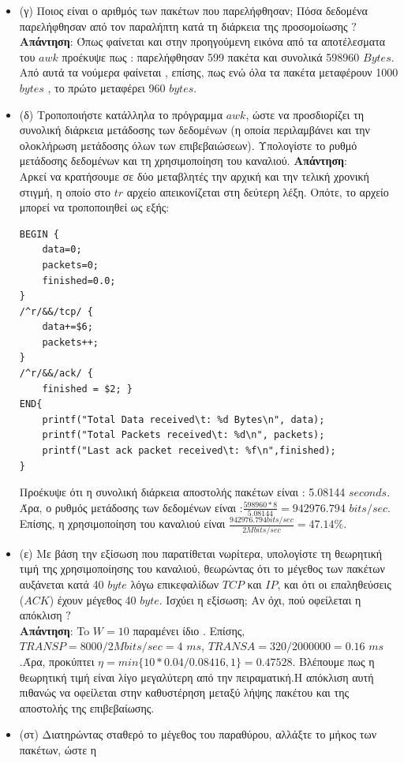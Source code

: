 \documentclass{article}%
\begin{document}
\begin{itemize}
\item	(γ) Ποιος είναι ο αριθμός των πακέτων που παρελήφθησαν; Πόσα δεδομένα παρελήφθησαν από τον
παραλήπτη κατά τη διάρκεια της προσομοίωσης $?$
\textbf{Απάντηση}:	Όπως φαίνεται και στην προηγούμενη εικόνα από τα αποτέλεσματα του $awk$ προέκυψε πως : παρελήφθησαν 599 πακέτα και συνολικά 598960 $Bytes$. Από αυτά τα νούμερα φαίνεται , επίσης, πως ενώ όλα τα πακέτα μεταφέρουν 1000 $bytes$ , το πρώτο μεταφέρει 960 $bytes$.
\\
\item	(δ) Τροποποιήστε κατάλληλα το πρόγραμμα $awk$, ώστε να προσδιορίζει τη συνολική διάρκεια
μετάδοσης των δεδομένων (η οποία περιλαμβάνει και την ολοκλήρωση μετάδοσης όλων των
επιβεβαιώσεων). Υπολογίστε το ρυθμό μετάδοσης δεδομένων και τη χρησιμοποίηση του καναλιού. 
\textbf{Απάντηση}:\\ Αρκεί να κρατήσουμε σε δύο μεταβλητές την αρχική και την τελική χρονική στιγμή, η οποίο στο $tr$ αρχείο απεικονίζεται στη δεύτερη λέξη. Οπότε, το αρχείο μπορεί να τροποποιηθεί ως εξής:
\begin{verbatim}
BEGIN {
	data=0;
	packets=0;
	finished=0.0;
}
/^r/&&/tcp/ {
	data+=$6;
	packets++;
}
/^r/&&/ack/ {
	finished = $2; }
END{
	printf("Total Data received\t: %d Bytes\n", data);
	printf("Total Packets received\t: %d\n", packets);
	printf("Last ack packet received\t: %f\n",finished);
}
\end{verbatim}
 Προέκυψε ότι η συνολική διάρκεια αποστολής πακέτων είναι : 5.08144 $seconds$.  Άρα, ο ρυθμός μετάδοσης των δεδομένων είναι :$\frac{598960*8}{5.08144}=942976.794$ $bits/sec$. Επίσης, η χρησιμοποίηση του καναλιού είναι $\frac{942976.794 bits/sec}{2Mbits/sec}=47.14\%$.
\item	(ε) Με βάση την εξίσωση που παρατίθεται νωρίτερα, υπολογίστε τη θεωρητική τιμή της
χρησιμοποίησης του καναλιού, θεωρώντας ότι το μέγεθος των πακέτων αυξάνεται κατά 40 $byte$
λόγω επικεφαλίδων $TCP$ και $IP$, και ότι οι επαληθεύσεις ($ACK$) έχουν μέγεθος 40 $byte$. Ισχύει η
εξίσωση; Αν όχι, πού οφείλεται η απόκλιση $?$\\
\textbf{Απάντηση}: To $W=10$ παραμένει ίδιο . Επίσης, $TRANSP=8000/2Mbits/sec=4$ $ms$,  $TRANSA=320/2000000=0.16$ $ms$.Άρα, προκύπτει $\eta= min\{10*0.04/0.08416,1\}=0.47528$. Βλέπουμε πως η θεωρητική τιμή είναι λίγο μεγαλύτερη από την πειραματική.Η απόκλιση αυτή πιθανώς να οφείλεται στην καθυστέρηση μεταξύ λήψης πακέτου και της αποστολής της επιβεβαίωσης.\\
\item	(στ) Διατηρώντας σταθερό το μέγεθος του παραθύρου, αλλάξτε το μήκος των πακέτων, ώστε η

\end{itemize}
\end{document}
